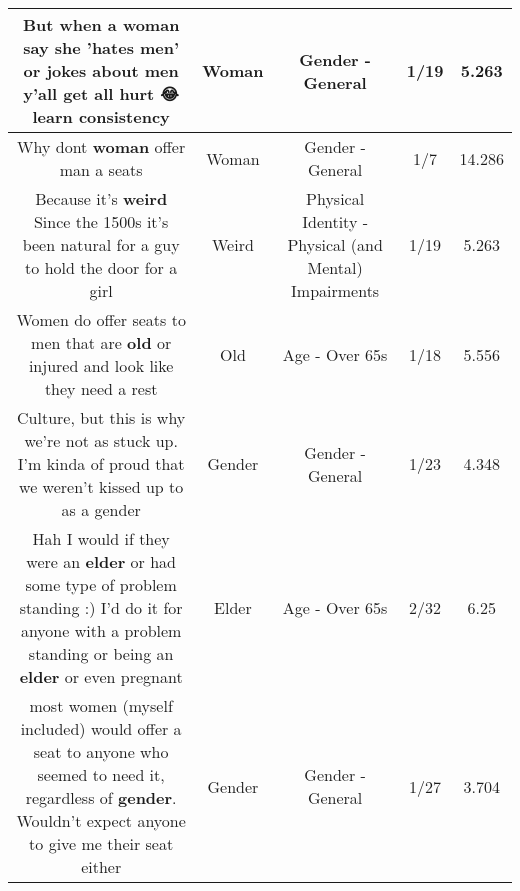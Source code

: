 \documentclass[11pt]{article}
\newlength\mylength
\begin{document}
\begin{center}
\begin{longtable}{|C{.65\mylength}|C{.30\mylength}|C{.12\mylength}|C{.12\mylength}|C{.12\mylength}|}
  \small But when a \textbf{woman} say she 'hates men' or jokes about men y'all get all hurt 😂 learn consistency\normalsize   & Woman & Gender - General & 1/19 & 5.263 \\  \hline
  \small Why dont \textbf{woman} offer man a seats\normalsize   & Woman & Gender - General & 1/7 & 14.286 \\  \hline
  \small Because it's \textbf{weird} Since the 1500s it's been natural for a guy to hold the door for a girl\normalsize   & Weird & Physical Identity - Physical (and Mental) Impairments & 1/19 & 5.263 \\  \hline
  \small Women do offer seats to men that are \textbf{old} or injured and look like they need a rest\normalsize   & Old & Age - Over 65s & 1/18 & 5.556 \\  \hline
  \small Culture, but this is why we're not as stuck up. I'm kinda of proud that we weren't kissed up to as a gender\normalsize   & Gender & Gender - General & 1/23 & 4.348 \\  \hline
  \small Hah I would if they were an \textbf{elder} or had some type of problem standing :) I'd do it for anyone with a problem standing or being an \textbf{elder} or even pregnant\normalsize   & Elder & Age - Over 65s & 2/32 & 6.25 \\  \hline
  \small most women (myself included) would offer a seat to anyone who seemed to need it, regardless of \textbf{gender}. Wouldn't expect anyone to give me their seat either\normalsize   & Gender & Gender - General & 1/27 & 3.704 \\  \hline

\end{longtable}
\end{center}
\end{document}
